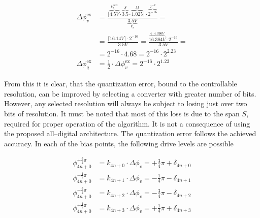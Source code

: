 \documentclass[journal,twoside,web]{ieeecolor}
\begin{document}
\begin{equation}
    \begin{split}
        \Delta\phi_{v}^{\text{ex}} & = \frac{\lceil \overbrace{4.5V}^{V_{\pi}^{\text{max}}} \cdot \overbrace{3.5}^{S} \cdot \overbrace{1.025}^{M} \rceil \cdot \overbrace{2^{-16}}^{2^{-N}} }{\underbrace{3.5V}_{V_{\pi}}} = \\
                                   & = \frac{\lceil 16.14V \rceil \cdot 2^{-16}}{3.5V} = \frac{\overbrace{16.384V}^{4 \cdot 4.096V} \cdot 2^{-16}}{3.5V} =                                                                   \\[10pt]
                                   & = 2^{-16} \cdot 4.68 = 2^{-16} \cdot 2^{2.23}                                                                                                                                           \\[10pt]
        \Delta\phi_{q}^{\text{ex}} & = \frac{1}{2} \cdot \Delta\phi_{v}^{\text{ex}} = 2^{-16} \cdot 2^{1.23}
    \end{split}
    \label{eq:error_example}
\end{equation}

\noindent
From this it is clear, that the quantization error, bound to the controllable resolution, can be improved by selecting a converter with greater number of bits. However, any selected resolution will always be subject to losing just over two bits of resolution. It must be noted that most of this loss is due to the span $S$, required for proper operation of the algorithm. It is not a consequence of using the proposed all--digital architecture. The quantization error follows the achieved accuracy. In each of the bias points, the following drive levels are possible

\begin{equation}
    \begin{split}
        \phi_{4n+0}^{+\frac{3}{2}\pi} & = k_{4n+0} \cdot \Delta\phi_{v} = +\frac{3}{4}\pi + \delta_{4n+0} \\
        \phi_{4n+0}^{-\frac{1}{2}\pi} & = k_{4n+1} \cdot \Delta\phi_{v} = -\frac{1}{4}\pi - \delta_{4n+1} \\
        \phi_{4n+0}^{-\frac{3}{2}\pi} & = k_{4n+2} \cdot \Delta\phi_{v} = -\frac{3}{4}\pi - \delta_{4n+2} \\
        \phi_{4n+0}^{+\frac{1}{2}\pi} & = k_{4n+3} \cdot \Delta\phi_{v} = +\frac{1}{4}\pi + \delta_{4n+3}
    \end{split}
    \label{eq:drive_shift_error}
\end{equation}
\end{document}
